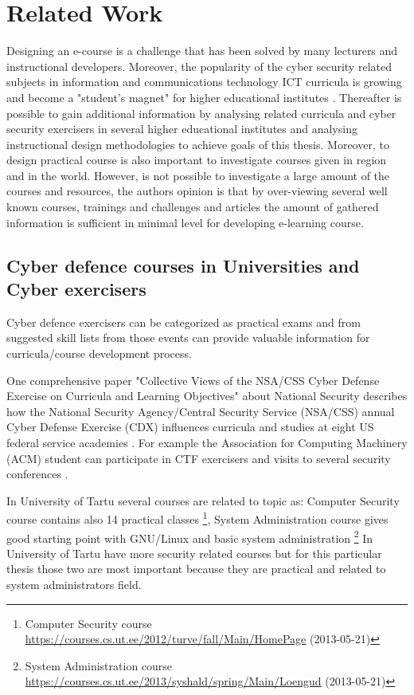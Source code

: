 \section{Related Work}
\label{Related Work}
Designing an e-course is a challenge that has been solved by many lecturers and instructional developers. Moreover, the popularity of the cyber security related subjects in information and communications technology ICT curricula is growing and become a "student’s magnet" for higher educational institutes \citep{CyberIsHot}. Thereafter is possible to gain additional information by analysing related curricula and cyber security exercisers  in several higher educational institutes and analysing instructional design methodologies to achieve goals of this thesis. Moreover, to design practical course is also important to investigate courses given in region and in the world. However, is not possible to investigate a large amount of the courses and resources, the authors opinion is that by over-viewing several well known courses, trainings and challenges and articles the amount of gathered information is sufficient in minimal level for developing e-learning course.

\subsection{Cyber defence courses in Universities and Cyber exercisers}
Cyber defence exercisers can be categorized as practical exams and from suggested skill lists from those events can provide valuable information for curricula/course development process.

One comprehensive paper "Collective Views of the NSA/CSS Cyber Defense Exercise
on Curricula and Learning Objectives" about National Security describes how the National Security
Agency/Central Security Service (NSA/CSS) annual Cyber Defense Exercise (\gls{CDX}) influences curricula and studies at eight US federal service academies \citep{adams_CDX_curricula}. For example the Association for Computing Machinery (ACM) student can participate in \gls{CTF} exercisers and  visits to several security conferences \citep{adams_CDX_curricula}.

In University of Tartu several courses are related to topic as: Computer Security course  contains also 14 practical classes \footnote{Computer Security course   \url{https://courses.cs.ut.ee/2012/turve/fall/Main/HomePage} (2013-05-21)}, System Administration course gives good starting point with GNU/Linux and basic system administration \footnote{ System Administration course  \url{https://courses.cs.ut.ee/2013/syshald/spring/Main/Loengud} (2013-05-21)}
In University of Tartu have more security related courses but for this particular thesis those two are most important because they are practical and related to system administrators field.

